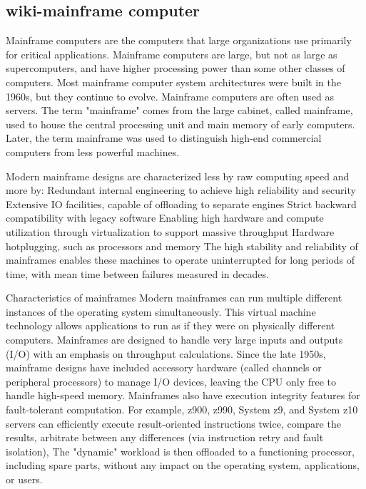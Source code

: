 \documentclass[a4paper,twoside]{scrbook}
\begin{document}
\subsection{wiki-mainframe computer\cite{mainframewiki}}
\par
Mainframe computers are the computers that large organizations use primarily for critical applications.
Mainframe computers are large, but not as large as supercomputers, and have higher processing power than some other classes of computers.
Most mainframe computer system architectures were built in the 1960s, but they continue to evolve. Mainframe computers are often used as servers.
The term "mainframe" comes from the large cabinet, called mainframe, used to house the central processing unit and main memory of early computers.
Later, the term mainframe was used to distinguish high-end commercial computers from less powerful machines.
\par
Modern mainframe designs are characterized less by raw computing speed and more by:
Redundant internal engineering to achieve high reliability and security
Extensive IO facilities, capable of offloading to separate engines
Strict backward compatibility with legacy software
Enabling high hardware and compute utilization through virtualization to support massive throughput
Hardware hotplugging, such as processors and memory
The high stability and reliability of mainframes enables these machines to operate uninterrupted for long periods of time, with mean time between failures measured in decades.
\par
Characteristics of mainframes
Modern mainframes can run multiple different instances of the operating system simultaneously. This virtual machine technology allows applications to run as if they were on physically different computers.
Mainframes are designed to handle very large inputs and outputs (I/O) with an emphasis on throughput calculations.
Since the late 1950s, mainframe designs have included accessory hardware (called channels or peripheral processors) to manage I/O devices, leaving the CPU only free to handle high-speed memory.
Mainframes also have execution integrity features for fault-tolerant computation.
For example, z900, z990, System z9, and System z10 servers can efficiently execute result-oriented instructions twice, compare the results, arbitrate between any differences (via instruction retry and fault isolation),
The "dynamic" workload is then offloaded to a functioning processor, including spare parts, without any impact on the operating system, applications, or users.
\end{document}
